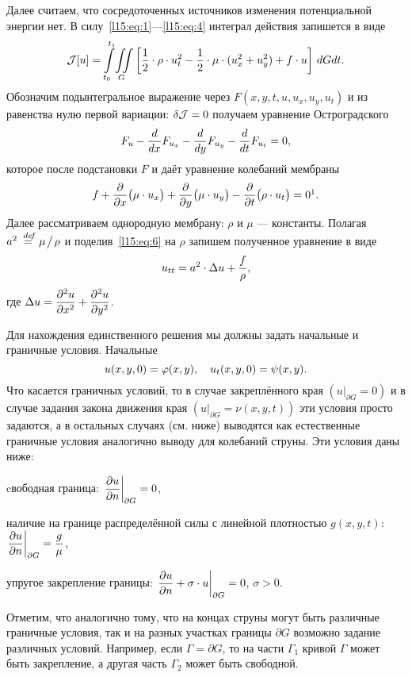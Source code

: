 Далее считаем, что сосредоточенных источников изменения потенциальной энергии нет. В силу~\eqref{l15:eq:1}---\eqref{l15:eq:4} интеграл действия запишется в виде
\begin{equation*}
	\hfill\J[u]=\int\limits_{t_0}^{t_1}\!\iint\limits_{G}\left[\frac{1}{2}\cdot\rho\cdot u_t^2-\frac{1}{2}\cdot\mu\cdot(u_x^2+u_y^2)+f\cdot u\right]\,dGdt.\hfill
\end{equation*}
Обозначим подынтегральное выражение через $F(x,y,t,u,u_x,u_y,u_t)$ и из равенства нулю первой вариации: $\delta\mathcal{J}=0$ получаем уравнение Остроградского
\begin{equation*}
	\hfill F_u-\der{}{x}F_{u_x}-\der{}{y}F_{u_y}-\der{}{t}F_{u_t}=0,\hfill
\end{equation*}
которое после подстановки $F$ и даёт уравнение колебаний мембраны
\begin{equation}\label{l15:eq:6}
	\hfill f+\pder{}{x}\big(\mu\cdot u_x\big)+\pder{}{y}\big(\mu\cdot u_y\big)-\pder{}{t}\big(\rho\cdot u_t\big)=0\footnotemark{}.\hfill
\end{equation}%
Далее рассматриваем однородную мембрану: $\rho$ и $\mu$ --- константы. Полагая $a^2\stackrel{\hspace{0.09 cm}de\!f}{=}\mu\!\bigm/\!\rho$ и поделив~\eqref{l15:eq:6} на $\rho$ запишем полученное уравнение в виде
\begin{equation}\label{l15:eq:7}
	\hfill u_{tt}=a^2\cdot\Delta u+\frac{f}{\rho},\hfill
\end{equation}
где $\displaystyle\Delta u=\frac{\partial^2u}{\partial x^2}+\frac{\partial^2u}{\partial y^2}$.

Для нахождения единственного решения мы должны задать начальные и граничные условия. Начальные
\begin{equation}\label{l15:eq:8}
	\hfill u(x,y,0)=\phi(x,y),\quad u_t(x,y,0)=\psi(x,y).\hfill
\end{equation}
Что касается граничных условий, то в случае закреплённого края $\left(u\Big|_{\partial G}=0\right)$ и в случае задания закона движения края $\left(u\Big|_{\partial G}=\nu(x,y,t)\right)$ эти условия просто задаются, а в остальных случаях (см. ниже) выводятся как естественные граничные условия аналогично выводу для колебаний струны. Эти условия даны ниже:
\begin{enumerateD}
	\item cвободная граница: $\displaystyle \left.\frac{\partial u}{\partial n}\right|_{\partial G}=0$,
	\item наличие на границе распределённой силы с линейной плотностью $g(x,y,t)$: $\displaystyle \left.\frac{\partial u}{\partial n}\right|_{\partial G}=\frac{g}{\mu}$,
	\item упругое закрепление границы: $\displaystyle\left.\frac{\partial u}{\partial n}+\sigma\cdot u\right|_{\partial G}=0$, $\sigma>0$. 
\end{enumerateD}
Отметим, что аналогично тому, что на концах струны могут быть различные граничные условия, так и на разных участках границы $\partial G$ возможно задание различных условий. Например, если $\Gamma=\partial G$, то на части $\Gamma_1$ кривой $\Gamma$ может быть закрепление, а другая часть $\Gamma_2$ может быть свободной.
\vspace{0.2cm}


